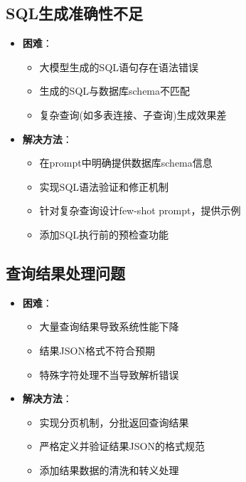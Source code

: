 \documentclass{article}
\begin{document}
	\subsection{SQL生成准确性不足}
	\begin{itemize}
		\item \textbf{困难}：
		\begin{itemize}
			\item 大模型生成的SQL语句存在语法错误
			\item 生成的SQL与数据库schema不匹配
			\item 复杂查询(如多表连接、子查询)生成效果差
		\end{itemize}
		
		\item \textbf{解决方法}：
		\begin{itemize}
			\item 在prompt中明确提供数据库schema信息
			\item 实现SQL语法验证和修正机制
			\item 针对复杂查询设计few-shot prompt，提供示例
			\item 添加SQL执行前的预检查功能
		\end{itemize}
	\end{itemize}
	
	\subsection{查询结果处理问题}
	\begin{itemize}
		\item \textbf{困难}：
		\begin{itemize}
			\item 大量查询结果导致系统性能下降
			\item 结果JSON格式不符合预期
			\item 特殊字符处理不当导致解析错误
		\end{itemize}
		
		\item \textbf{解决方法}：
		\begin{itemize}
			\item 实现分页机制，分批返回查询结果
			\item 严格定义并验证结果JSON的格式规范
			\item 添加结果数据的清洗和转义处理
		\end{itemize}
	\end{itemize}
	
\end{document}
